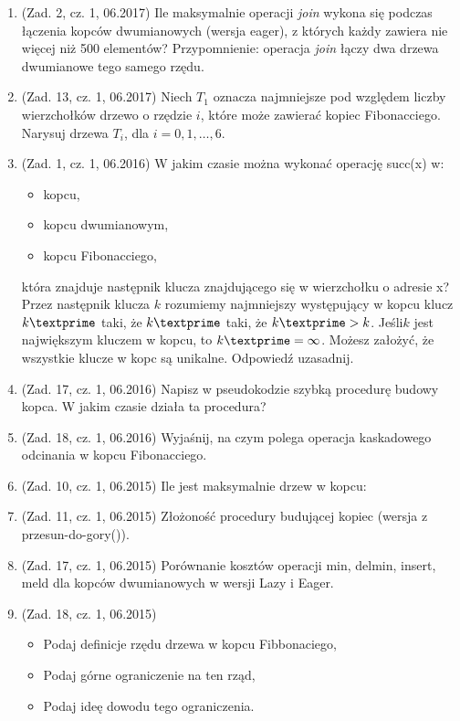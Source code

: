 \documentclass[10pt]{article}%
\begin{document}
\begin{enumerate}

\item (Zad. 2, cz. 1, 06.2017) Ile maksymalnie operacji \textit{join} wykona się podczas łączenia kopców dwumianowych (wersja eager), z których każdy zawiera nie więcej niż 500 elementów? Przypomnienie: operacja \textit{join} łączy dwa drzewa dwumianowe tego samego rzędu.

\item (Zad. 13, cz. 1, 06.2017) Niech $T_{1}$ oznacza najmniejsze pod względem liczby wierzchołków drzewo o rzędzie $i$, które może zawierać kopiec Fibonacciego. Narysuj drzewa $T_{i}$, dla $i = 0,1,\ldots,6$.

\item (Zad. 1, cz. 1, 06.2016) W jakim czasie można wykonać operację succ(x) w:
\begin{itemize}
\item kopcu,
\item kopcu dwumianowym,
\item kopcu Fibonacciego,
\end{itemize}
która znajduje następnik klucza znajdującego się w wierzchołku o adresie x? Przez następnik klucza $k$ rozumiemy najmniejszy występujący w kopcu klucz $k\textprime$ taki, że $k\textprime$ taki, że $ k\textprime > k$. Jeśli$k$ jest największym kluczem w kopcu, to $k\textprime = \infty$. Możesz założyć, że wszystkie klucze w kopc są unikalne. Odpowiedź uzasadnij.
\item (Zad. 17, cz. 1, 06.2016) Napisz w pseudokodzie szybką procedurę budowy kopca. W jakim czasie działa ta procedura?

\item (Zad. 18, cz. 1, 06.2016) Wyjaśnij, na czym polega operacja kaskadowego odcinania w kopcu Fibonacciego.

\item (Zad. 10, cz. 1, 06.2015) Ile jest maksymalnie drzew w kopcu:

\item (Zad. 11, cz. 1, 06.2015) Złożoność procedury budującej kopiec (wersja z przesun-do-gory()).

\item (Zad. 17, cz. 1, 06.2015) Porównanie kosztów operacji { min, delmin, insert, meld } dla kopców dwumianowych w wersji Lazy i Eager.

\item (Zad. 18, cz. 1, 06.2015) 
\begin{itemize}
	\item Podaj definicje rzędu drzewa w kopcu Fibbonaciego, 
	\item Podaj górne ograniczenie na ten rząd, 
	\item Podaj ideę dowodu tego ograniczenia. 
\end{itemize}

\end{enumerate}
\end{document}
